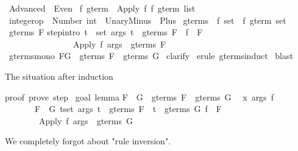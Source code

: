 %
\begin{isabellebody}%
\def\isabellecontext{Advanced}%
\isanewline
{}\ Advanced\ {\isacharequal}\ Even{\isacharcolon}\isanewline
\isanewline
\isanewline
{}\ {\isacharprime}f\ gterm\ {\isacharequal}\ Apply\ {\isacharprime}f\ {\isachardoublequote}{\isacharprime}f\ gterm\ list{\isachardoublequote}\isanewline
\isanewline
{}\ integer{\isacharunderscore}op\ {\isacharequal}\ Number\ int\ {\isacharbar}\ UnaryMinus\ {\isacharbar}\ Plus\isanewline
\isanewline
{}\ gterms\ {\isacharcolon}{\isacharcolon}\ {\isachardoublequote}{\isacharprime}f\ set\ {\isasymRightarrow}\ {\isacharprime}f\ gterm\ set{\isachardoublequote}\isanewline
{}\ {\isachardoublequote}gterms\ F{\isachardoublequote}\isanewline
{}\isanewline
step{\isacharbrackleft}intro{\isacharbang}{\isacharbrackright}{\isacharcolon}\ {\isachardoublequote}{\isasymlbrakk}{\isasymforall}t\ {\isasymin}\ set\ args{\isachardot}\ t\ {\isasymin}\ gterms\ F{\isacharsemicolon}\ \ f\ {\isasymin}\ F{\isasymrbrakk}\isanewline
\ \ \ \ \ \ \ \ \ \ \ \ \ \ \ {\isasymLongrightarrow}\ {\isacharparenleft}Apply\ f\ args{\isacharparenright}\ {\isasymin}\ gterms\ F{\isachardoublequote}\isanewline
\isanewline
{}\ gterms{\isacharunderscore}mono{\isacharcolon}\ {\isachardoublequote}F{\isasymsubseteq}G\ {\isasymLongrightarrow}\ gterms\ F\ {\isasymsubseteq}\ gterms\ G{\isachardoublequote}\isanewline
{}\ clarify\isanewline
{}\ {\isacharparenleft}erule\ gterms{\isachardot}induct{\isacharparenright}\isanewline
{}\ blast\isanewline
{}%
\begin{isamarkuptext}%
The situation after induction

proof\ {\isacharparenleft}prove{\isacharparenright}{\isacharcolon}\ step\ {}\isanewline
\isanewline
goal\ {\isacharparenleft}lemma{\isacharparenright}{\isacharcolon}\isanewline
F\ {\isasymsubseteq}\ G\ {\isasymLongrightarrow}\ gterms\ F\ {\isasymsubseteq}\ gterms\ G\isanewline
\ {}{\isachardot}\ {\isasymAnd}x\ args\ f{\isachardot}\isanewline
\ \ \ \ \ \ \ {\isasymlbrakk}F\ {\isasymsubseteq}\ G{\isacharsemicolon}\ {\isasymforall}t{\isasymin}set\ args{\isachardot}\ t\ {\isasymin}\ gterms\ F\ {\isasymand}\ t\ {\isasymin}\ gterms\ G{\isacharsemicolon}\ f\ {\isasymin}\ F{\isasymrbrakk}\isanewline
\ \ \ \ \ \ \ {\isasymLongrightarrow}\ Apply\ f\ args\ {\isasymin}\ gterms\ G%
\end{isamarkuptext}%
%
\begin{isamarkuptext}%
We completely forgot about "rule inversion". 


\end{isamarkuptext}
\end{isabellebody}
